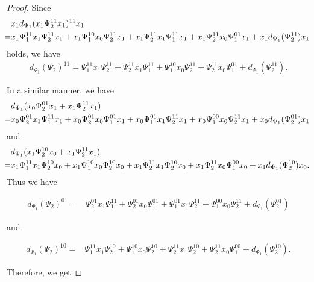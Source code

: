 \documentclass[15pt,oneside,reqno]{amsart}
\theoremstyle{remark}{
\newtheorem{lem}[df]{Lemma}
\newtheorem{prop}[df]{Proposition}
\newtheorem{ex}[df]{Example}
\newtheorem{rmk}[df]{Remark}
}
\begin{document}
\begin{proof}

Since 
\begin{align*}
\begin{aligned}
&x_1d_{\Psi_1}(x_1\Psi_2^{11}x_1)^{11}x_1\\
\hspace{-0.1cm}=& x_1\Psi_1^{11}x_1 \Psi_2^{11}x_1 + x_1\Psi_1^{10}x_0 \Psi_2^{11}x_1 + x_1\Psi_2^{11}x_1\Psi_1^{11}x_1 + x_1\Psi_2^{11}x_0\Psi_1^{01}x_1 + x_1d_{\Psi_1}(\Psi_2^{11})x_1
\end{aligned}
\end{align*}
holds, we have
\begin{align*}
d_{\Psi_1}(\Psi_2)^{11} = \Psi_1^{11}x_1\Psi_2^{11} + \Psi_2^{11}x_1\Psi_1^{11} + \Psi_1^{10}x_0\Psi_2^{11} + \Psi_2^{11}x_0\Psi_1^{01} + d_{\Psi_1}(\Psi_2^{11}).
\end{align*}

In a similar manner, we have
\begin{align*}
&d_{\Psi_1}(x_0\Psi_2^{01}x_1 + x_1\Psi_2^{11}x_1)\\
\hspace{-0.1cm}=&x_0\Psi_2^{01}x_1\Psi_1^{11}x_1 + x_0\Psi_{2}^{01}x_0\Psi_1^{01}x_1 + x_0\Psi_{1}^{01}x_1\Psi_2^{11}x_1 + x_0\Psi_{1}^{00}x_0\Psi_2^{11}x_1 + x_0d_{\Psi_1}(\Psi_2^{01})x_1
\end{align*}
and
\begin{align*}
&d_{\Psi_1}(x_1\Psi_2^{10}x_0 + x_1\Psi_2^{11}x_1)\\
\hspace{-0.1cm}=&x_1\Psi_1^{11}x_1\Psi_2^{10}x_0 + x_1\Psi_{1}^{10}x_0\Psi_2^{10}x_0 + x_1\Psi_{2}^{11}x_1\Psi_2^{10}x_0 + x_1\Psi_{2}^{11}x_0\Psi_1^{00}x_0 + x_1d_{\Psi_1}(\Psi_2^{10})x_0.
\end{align*}
Thus we have

\begin{align*}
d_{\Psi_1}(\Psi_2)^{01} =& \Psi_2^{01}x_1\Psi_1^{11} + \Psi_{2}^{01}x_0\Psi_1^{01} + \Psi_{1}^{01}x_1\Psi_2^{11} + \Psi_{1}^{00}x_0\Psi_2^{11} + d_{\Psi_1}(\Psi_2^{01})
\end{align*}

and

\begin{align*}
d_{\Psi_1}(\Psi_2)^{10} =&\Psi_1^{11}x_1\Psi_2^{10} + \Psi_{1}^{10}x_0\Psi_2^{10} + \Psi_{2}^{11}x_1\Psi_2^{10} + \Psi_{2}^{11}x_0\Psi_1^{00} + d_{\Psi_1}(\Psi_2^{10}).
\end{align*}

Therefore, we get


\end{proof}
\end{document}
